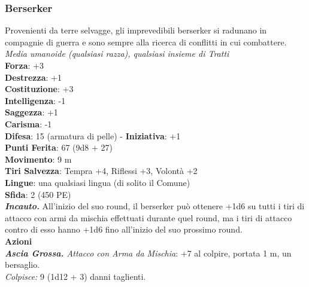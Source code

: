 \begin{multicols}{2}
\subsubsection{Berserker}

Provenienti da terre selvagge, gli imprevedibili berserker si radunano in compagnie di guerra e sono sempre alla ricerca di conflitti in cui combattere.\\
\emph{Media umanoide (qualsiasi razza), qualsiasi insieme di Tratti}\\
\textbf{Forza}: +3\\
\textbf{Destrezza}: +1\\
\textbf{Costituzione}: +3\\
\textbf{Intelligenza}: -1\\
\textbf{Saggezza}: +1\\
\textbf{Carisma}: -1\\
\textbf{Difesa}: 15 (armatura di pelle) - \textbf{Iniziativa}: +1\\
\textbf{Punti Ferita}: 67 (9d8 + 27)\\
\textbf{Movimento}: 9 m\\
\textbf{Tiri Salvezza}: Tempra +4, Riflessi +3, Volontà +2 \\
\textbf{Lingue}: una qualsiasi lingua (di solito il Comune)\\
\textbf{Sfida}: 2 (450 PE)\smallskip\\
\emph{\textbf{Incauto.}} All'inizio del suo round, il berserker può ottenere +1d6 su tutti i tiri di attacco con armi da mischia effettuati durante quel round, ma i tiri di attacco contro di esso hanno +1d6 fino all'inizio del suo prossimo round.\\
\smallskip\textbf{Azioni} \\
\emph{\textbf{Ascia Grossa.} Attacco con Arma da Mischia}: +7 al colpire, portata 1 m, un bersaglio.\\
\emph{Colpisce:} 9 (1d12 + 3) danni taglienti. \\



\end{multicols}
